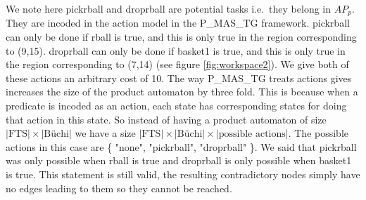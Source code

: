 We note here pickrball and droprball are potential tasks i.e.\ they belong in $AP_p$. They are incoded in the action model in the P\_MAS\_TG framework. pickrball can only be done if rball is true, and this is only true in the region corresponding to (9,15).  droprball can only be done if basket1 is true, and this is only true in the region corresponding to (7,14) (see figure \ref{fig:workspace2}). We give both of these actions an arbitrary cost of 10. The way P\_MAS\_TG treats actions gives increases the size of the product automaton by three fold. This is because when a predicate is incoded as an action, each state has corresponding states for doing that action in this state. So instead of having a product automaton of size $|\text{FTS}| \times |\text{B\"uchi}| $ we have a size $|\text{FTS}| \times |\text{B\"uchi}| \times |\text{possible actions}|$. The possible actions in this case are \{ "none", "pickrball", "droprball" \}. We said that pickrball was only possible when rball is true and droprball is only possible when basket1 is true. This statement is still valid, the resulting contradictory nodes simply have no edges leading to them so they cannot be reached. 


